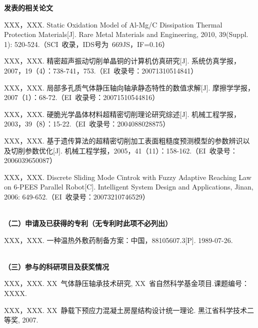 \begin{publication}
\noindent\textbf{发表的相关论文}
\begin{publist}
\item XXX，XXX. Static Oxidation Model of Al-Mg/C Dissipation Thermal Protection Materials[J]. Rare Metal Materials and Engineering, 2010, 39(Suppl. 1): 520-524.（SCI~收录，IDS号为~669JS，IF=0.16）
\item XXX，XXX. 精密超声振动切削单晶铜的计算机仿真研究[J]. 系统仿真学报，2007，19（4）：738-741，753.（EI~收录号：20071310514841）
\item XXX，XXX. 局部多孔质气体静压轴向轴承静态特性的数值求解[J]. 摩擦学学报，2007（1）：68-72.（EI~收录号：20071510544816）
\item XXX，XXX. 硬脆光学晶体材料超精密切削理论研究综述[J]. 机械工程学报，2003，39（8）：15-22.（EI~收录号：2004088028875）
\item XXX，XXX. 基于遗传算法的超精密切削加工表面粗糙度预测模型的参数辨识以及切削参数优化[J]. 机械工程学报，2005，41（11）：158-162.（EI~收录号：2006039650087）
\item XXX，XXX. Discrete Sliding Mode Cintrok with Fuzzy Adaptive Reaching Law on 6-PEES Parallel Robot[C]. Intelligent System Design and Applications, Jinan, 2006: 649-652.（EI~收录号：20073210746529）
\end{publist}

~\\

\noindent\textbf{（二）申请及已获得的专利（无专利时此项不必列出）}
\begin{publist}
\item XXX，XXX. 一种温热外敷药制备方案：中国，88105607.3[P]. 1989-07-26.
\end{publist}

~\\

\noindent\textbf{（三）参与的科研项目及获奖情况}
\begin{publist}
\item XXX，XXX. XX~气体静压轴承技术研究, XX~省自然科学基金项目.课题编号：XXXX.
\item XXX，XXX. XX~静载下预应力混凝土房屋结构设计统一理论. 黑江省科学技术二等奖, 2007.
\end{publist}
\end{publication}
